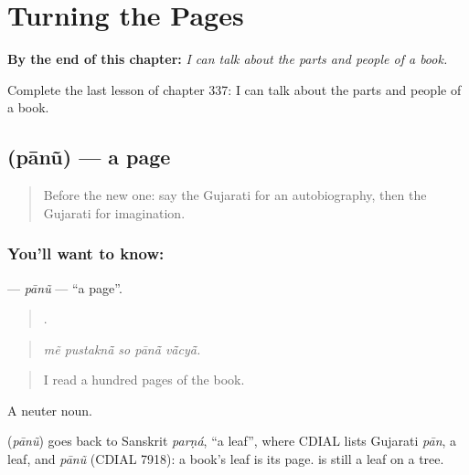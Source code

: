
\chapter{Turning the Pages}
\label{ch:gu-turning-the-pages}

\begin{chapteropening}
\textbf{By the end of this chapter:} \emph{I can talk about the parts and people of a book.}

Complete the last lesson of chapter 337: I can talk about the parts and people of a book.
\end{chapteropening}

\section[\texorpdfstring{\gu{પાનું} (pānũ)}{પાનું (pānũ)}]{ (pānũ) — a page}

\label{lesson:GU-C337-panu}



\begin{quote}
Before the new one: say the Gujarati for an autobiography, then the Gujarati for imagination.
\end{quote}

\subsection*{You'll want to know: }
\textbf{} — \emph{pānũ} — \textquotedblleft{}a page\textquotedblright{}.

\begin{quote}
    .
\end{quote}

\begin{quote}
\emph{mẽ pustaknā̃ so pānā̃ vā̃cyā̃.}
\end{quote}

\begin{quote}
I read a hundred pages of the book.
\end{quote}

A neuter noun.

\begin{cousinweb}
\textbf{} (\emph{pānũ}) goes back to Sanskrit \emph{parṇá}, \textquotedblleft{}a leaf\textquotedblright{}, where CDIAL lists Gujarati \emph{pān}, a leaf, and \emph{pānũ} (CDIAL 7918): a book's leaf is its page. \textbf{} is still a leaf on a tree.
\end{cousinweb}

